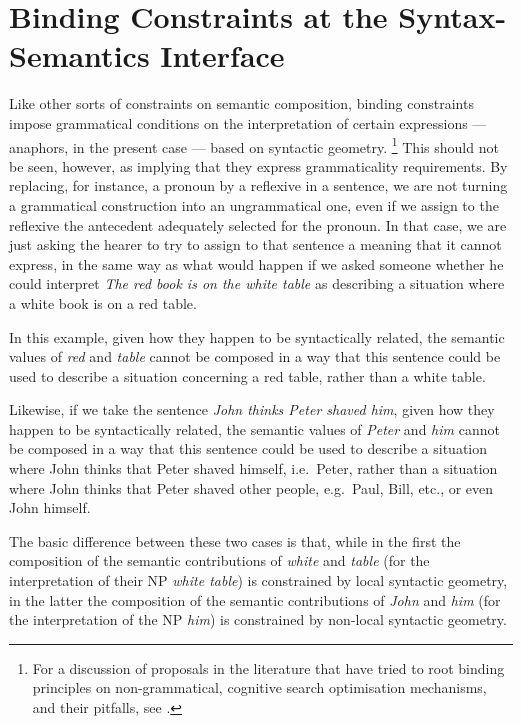 \documentclass[output=paper
,modfonts
,nonflat]{langsci/langscibook}
\begin{document}
\section{Binding Constraints at the Syntax-Semantics Interface\label{sem}}

Like other sorts of constraints on semantic composition, binding
constraints impose grammatical conditions on the interpretation of certain expressions
--- anaphors, in the present case --- based on syntactic geometry.%
\footnote{
For a discussion of proposals in the literature that have tried to root binding principles on non-grammatical,
cognitive search optimisation mechanisms, and their pitfalls, see \citep{branco:2000,branco:2003,branco:2004}.
}
This should not
be seen, however, as implying that they
express grammaticality requirements. By replacing, for instance, a pronoun 
by a reflexive in a sentence, we are not turning a grammatical construction into 
an ungrammatical one, even if we assign to the reflexive the 
antecedent adequately selected for the pronoun. In that case, we 
are just asking the hearer to try to assign to that sentence a 
meaning that it cannot express, in the same way as what would 
happen if we asked someone whether he could interpret {\it The red book 
is on the white table} as describing a situation where a white 
book is on a red table. 

In this example, given how they happen to be syntactically related, 
the semantic values of {\it red} and {\it table} cannot be composed in a way 
that this sentence could be used to describe a situation 
concerning a red table, rather than a white table. 

Likewise, if we 
take the sentence {\it John thinks Peter shaved him}, given how they happen to be 
syntactically related, the semantic values of {\it Peter} and {\it him} cannot 
be composed in a way that this sentence could be used to describe a 
situation where John thinks that Peter shaved himself, i.e.\ Peter, rather than
a situation where John thinks that Peter shaved other people, e.g.\ Paul,
Bill, etc., or even John himself. 

The 
basic difference between these two cases is that, while in the 
first the composition of the semantic contributions of {\it white} and 
{\it table} (for the interpretation of their NP {\it white table}) is constrained by local
syntactic geometry, in the
latter the composition of the semantic contributions of {\it John} 
and {\it him} (for the interpretation of the NP {\it him}) is 
constrained by non-local syntactic geometry.
\end{document}
